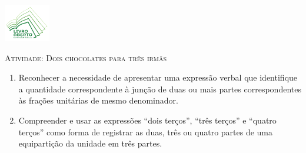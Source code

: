 \documentclass[10 pt,usenames,dvipsnames, oneside]{article}
\begin{document}
\begin{center}
  \begin{minipage}[l]{3cm}
\includegraphics[width=2cm]{../../../Figuras/logo}       
\end{minipage}\hfill
\begin{minipage}[r]{.8\textwidth}
 {\Large \scshape Atividade: Dois chocolates para três irmãs}  
\end{minipage}
\end{center}
\vspace{.2cm}

\ifdefined\prof
\begin{goals}
\begin{enumerate}

\item Reconhecer a necessidade de apresentar uma expressão verbal que identifique a quantidade correspondente à junção de duas ou mais partes correspondentes às frações unitárias de mesmo denominador.

\item Compreender e usar as expressões ``dois terços'', ``três terços'' e ``quatro terços'' como forma de registrar as duas, três ou quatro partes de uma equipartição da unidade em três partes.

\end{enumerate}
\tcblower


\end{goals}
\end{document}
